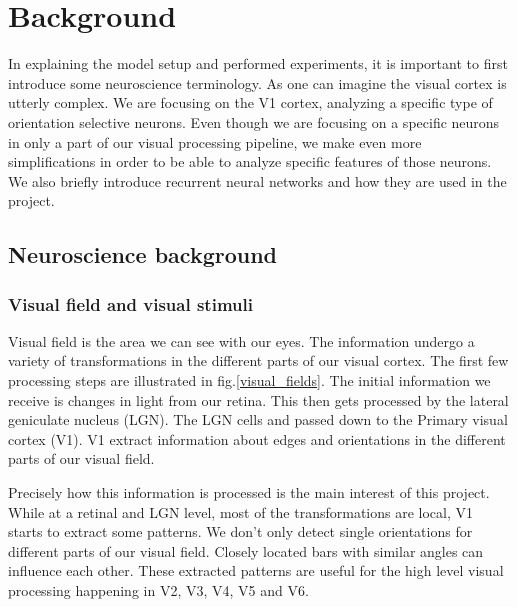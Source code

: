 

\chapter{Background}

In explaining the model setup and performed experiments, it is important to first introduce some neuroscience terminology. As one can imagine the visual cortex is utterly complex. We are focusing on the V1 cortex, analyzing a specific type of orientation selective neurons. Even though we are focusing on a specific neurons in only a part of our visual processing pipeline, we make even more simplifications in order to be able to analyze specific features of those neurons. We also briefly introduce recurrent neural networks and how they are used in the project.

\section{Neuroscience background}
\subsection{Visual field and visual stimuli}

Visual field is the area we can see with our eyes. The information undergo a variety of transformations in the different parts of our visual cortex. The first few processing steps are illustrated in fig.\ref{visual_fields}. The initial information we receive is changes in light from our retina. This then gets processed by the lateral geniculate nucleus (LGN). The LGN cells  and passed down to the Primary visual cortex (V1). V1 extract information about edges and orientations in the different parts of our visual field. 


Precisely how this information is processed is the main interest of this project. While at a retinal and LGN level, most of the transformations are local, V1 starts to extract some patterns. We don't only detect single orientations for different parts of our visual field. Closely located bars with similar angles can influence each other. These extracted patterns are useful for the high level visual processing happening in V2, V3, V4, V5 and V6. 

